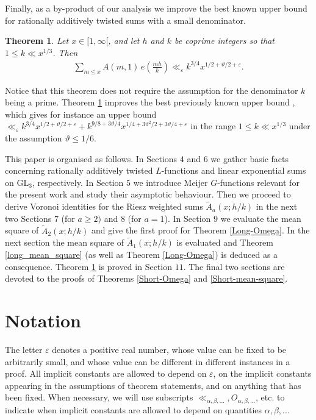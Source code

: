 \documentclass[a4paper,10pt,twoside]{amsart}
\newtheorem{theorem}{Theorem}[section]
\theoremstyle{definition}
\numberwithin{equation}{section}
\newcommand\eps{\varepsilon}
\renewcommand\:{\colon}
\begin{document}
Finally, as a by-product of our analysis we improve the best known upper bound for rationally additively twisted sums with a small denominator. 
\begin{theorem}\label{improved-upper-bound}
Let $x\in[1,\infty[$, and let $h$ and $k$ be coprime integers so that $1\leqslant k\ll x^{1/3}$. Then 
\begin{align*}
\sum_{m\leqslant x}A(m,1)\,e\!\left(\frac{mh}k\right)\ll_\eps k^{3/4}x^{1/2+\vartheta/2+\varepsilon}.
\end{align*}
\end{theorem}

\noindent Notice that this theorem does not require the assumption for the denominator $k$ being a prime. Theorem \ref{improved-upper-bound} improves the best previously known upper bound \cite[Corollary 3]{Jaasaari--Vesalainen1}, which gives for instance an upper bound $\ll_\varepsilon k^{3/4}x^{1/2+\vartheta/2+\varepsilon}+k^{9/8+3\vartheta/4}x^{1/4+3\vartheta^2/2+3\vartheta/4+\varepsilon}$ in the range $1\leq k\ll x^{1/3}$ under the assumption $\vartheta\leq 1/6$. 

This paper is organised as follows. In Sections $4$ and $6$ we gather basic facts concerning rationally additively twisted $L$-functions and linear exponential sums on $\mathrm{GL}_3$, respectively. In Section $5$ we introduce Meijer $G$-functions relevant for the present work and study their asymptotic behaviour. Then we proceed to derive Voronoi identities for the Riesz weighted sums $\widetilde A_a(x;h/k)$ in the next two Sections $7$ (for $a\geq 2)$ and $8$ (for $a=1$). In Section $9$ we evaluate the mean square of $\widetilde A_2(x;h/k)$ and give the first proof for Theorem \ref{Long-Omega}. In the next section the mean square of $\widetilde A_1(x;h/k)$ is evaluated and Theorem \ref{long_mean_square} (as well as Theorem \ref{Long-Omega}) is deduced as a consequence. Theorem \ref{improved-upper-bound} is proved in Section $11$. The final two sections are devoted to the proofs of Theorems \ref{Short-Omega} and \ref{Short-mean-square}. 

\section{Notation}

\noindent The letter $\varepsilon$ denotes a positive real number, whose value can be fixed to be arbitrarily small, and whose value can be different in different instances in a proof.  All implicit constants are allowed to depend on $\varepsilon$, on the implicit constants appearing in the assumptions of theorem statements, and on anything that has been fixed. When necessary, we will use subscripts $\ll_{\alpha,\beta,...},O_{\alpha,\beta,...}$, etc. to indicate when implicit constants are allowed to depend on quantities $\alpha,\beta,...$
  
\end{document}
